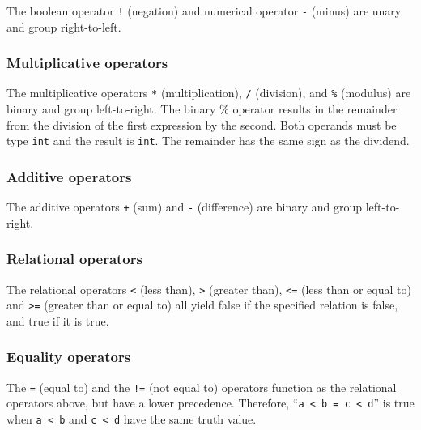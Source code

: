 The boolean operator \texttt{!} (negation) and numerical operator \texttt{-} (minus) are unary and group right-to-left.

\begin{alltt}
\quad \term{-} 
\quad \term{!} 
\end{alltt}

\subsubsection{Multiplicative operators}
The multiplicative operators \texttt{*} (multiplication), \texttt{/} (division), and \texttt{\%} (modulus) are binary and group left-to-right. The  binary \% operator results in the remainder from the division of the first expression by the second. Both operands must be type \texttt{int} and the result is \texttt{int}. The remainder has the same sign as the dividend.

\begin{alltt}
\quad {} \term{*} 
\quad {} \term{/} 
\quad {} \term{\%} 
\end{alltt}

\subsubsection{Additive operators}
The additive operators \texttt{+} (sum) and \texttt{-} (difference) are binary and group left-to-right.
\begin{alltt}
\quad {} \term{+} 
\quad {} \term{-} 
\end{alltt}

\subsubsection{Relational operators}
The  relational operators \texttt< (less than), \texttt> (greater than), \texttt{<=} (less than or equal to) and \texttt{>=} (greater than or equal to) all yield false if the specified relation is false, and true if it is true.
\begin{alltt}
\quad {} \term{<} 
\quad {} \term{>} 
\quad {} \term{<=} 
\quad {} \term{>=} 
\end{alltt}

\subsubsection{Equality operators}
The \texttt{=} (equal to) and the \texttt{!=} (not equal to) operators function as the relational operators above, but have a lower precedence. Therefore, ``\texttt{a < b = c < d}'' is true when \texttt{a < b} and \texttt{c < d} have the same truth value.
\begin{alltt}
\quad {} \term{=} 
\quad {} \term{!=} 
\end{alltt}

